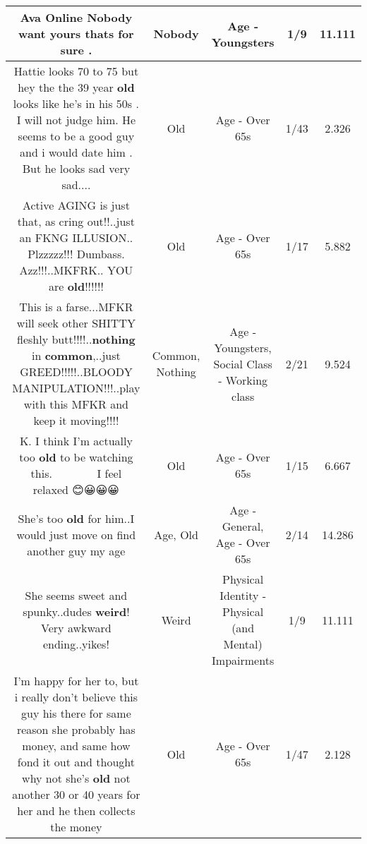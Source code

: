 \documentclass[11pt]{article}
\newlength\mylength
\begin{document}
\begin{center}
\begin{longtable}{|C{.65\mylength}|C{.30\mylength}|C{.12\mylength}|C{.12\mylength}|C{.12\mylength}|}
  \small Ava Online \textbf{Nobody} want yours thats for sure .\normalsize   & Nobody & Age - Youngsters & 1/9 & 11.111 \\  \hline
  \small Hattie looks 70 to 75 but hey the the 39  year \textbf{old} looks like he's in his 50s . I will not judge him. He seems to be a good guy and i would date him . But he looks sad very sad....\normalsize   & Old & Age - Over 65s & 1/43 & 2.326 \\  \hline
  \small Active AGING is just that, as cring out!!..just an FKNG ILLUSION.. Plzzzzz!!! Dumbass. Azz!!!..MKFRK.. YOU are \textbf{old}!!!!!!\normalsize   & Old & Age - Over 65s & 1/17 & 5.882 \\  \hline
  \small This is a farse...MFKR will seek other SHITTY fleshly butt!!!!..\textbf{nothing} in \textbf{common},..just GREED!!!!!..BLOODY MANIPULATION!!!..play with this MFKR and keep it moving!!!!\normalsize   & Common, Nothing & Age - Youngsters, Social Class - Working class & 2/21 & 9.524 \\  \hline
  \small K. I think I'm actually too \textbf{old} to be watching this. 🤣🤣🤣🤣💤💤💤💤💤💤💤💤💤I feel relaxed 😊😀😀😀\normalsize   & Old & Age - Over 65s & 1/15 & 6.667 \\  \hline
  \small She's too \textbf{old} for him..I would just move on find another guy my age\normalsize   & Age, Old & Age - General, Age - Over 65s & 2/14 & 14.286 \\  \hline
  \small She seems sweet and spunky..dudes \textbf{weird}! Very awkward ending..yikes!\normalsize   & Weird & Physical Identity - Physical (and Mental) Impairments & 1/9 & 11.111 \\  \hline
  \small I'm  happy  for her  to, but i really  don't  believe  this guy  his there  for same reason  she probably  has money,  and same how fond  it out and thought  why not  she's  \textbf{old}  not another  30 or 40 years  for her  and he then  collects  the money\normalsize   & Old & Age - Over 65s & 1/47 & 2.128 \\  \hline

\end{longtable}
\end{center}
\end{document}
